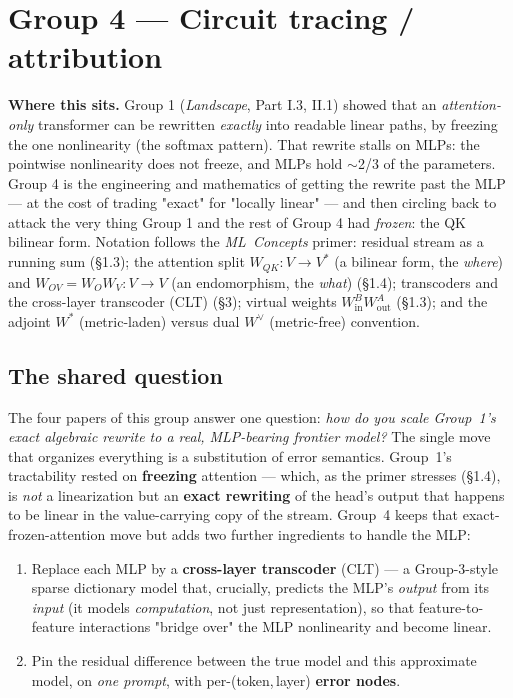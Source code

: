 


\section*{Group 4 --- Circuit tracing / attribution}

\begin{callout}
\textbf{Where this sits.} Group 1 (\emph{Landscape}, Part I.3, II.1) showed that an \emph{attention-only} transformer can be rewritten \emph{exactly} into readable linear paths, by freezing the one nonlinearity (the softmax pattern). That rewrite stalls on MLPs: the pointwise nonlinearity does not freeze, and MLPs hold $\sim$2/3 of the parameters. Group 4 is the engineering and mathematics of getting the rewrite past the MLP --- at the cost of trading "exact" for "locally linear" --- and then circling back to attack the very thing Group 1 and the rest of Group 4 had \emph{frozen}: the QK bilinear form. Notation follows the \emph{ML~Concepts} primer: residual stream as a running sum (§1.3); the attention split $W_{QK}:V\to V^{*}$ (a bilinear form, the \emph{where}) and $W_{OV}=W_OW_V:V\to V$ (an endomorphism, the \emph{what}) (§1.4); transcoders and the cross-layer transcoder (CLT) (§3); virtual weights $W_{\text{in}}^{B}W_{\text{out}}^{A}$ (§1.3); and the adjoint $W^{*}$ (metric-laden) versus dual $W^{\vee}$ (metric-free) convention.
\end{callout}

\subsection*{The shared question}

The four papers of this group answer one question: \emph{how do you scale Group~1's exact algebraic rewrite to a real, MLP-bearing frontier model?} The single move that organizes everything is a substitution of error semantics. Group~1's tractability rested on \textbf{freezing} attention --- which, as the primer stresses (§1.4), is \emph{not} a linearization but an \textbf{exact rewriting} of the head's output that happens to be linear in the value-carrying copy of the stream. Group~4 keeps that exact-frozen-attention move but adds two further ingredients to handle the MLP:

\begin{enumerate}[leftmargin=1.4em,itemsep=2pt]
\item Replace each MLP by a \textbf{cross-layer transcoder} (CLT) --- a Group-3-style sparse dictionary model that, crucially, predicts the MLP's \emph{output} from its \emph{input} (it models \emph{computation}, not just representation), so that feature-to-feature interactions "bridge over" the MLP nonlinearity and become linear.
\item Pin the residual difference between the true model and this approximate model, on \emph{one prompt}, with per-(token,\,layer) \textbf{error nodes}.
\end{enumerate}

